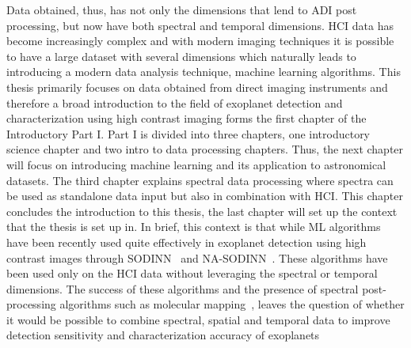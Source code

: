 Data obtained, thus, has not only the dimensions that lend to ADI post processing, but now have both spectral and temporal dimensions.
HCI data has become increasingly complex and with modern imaging techniques it is possible to have a large dataset with several dimensions which naturally
leads to introducing a modern data analysis technique, machine learning algorithms.
This thesis primarily focuses on data obtained from direct imaging instruments and therefore a broad introduction to the field of exoplanet detection and characterization using high contrast imaging forms the first chapter of the Introductory Part I.
Part I is divided into three chapters, one introductory science chapter and two intro to data processing chapters.
Thus, the next chapter will focus on introducing machine learning and its application to astronomical datasets.
The third chapter explains spectral data processing where spectra can be used as standalone data input but also in combination with HCI.
This chapter concludes the introduction to this thesis, the last chapter will set up the context that the thesis is set up in.
In brief, this context is that while ML algorithms have been recently used quite effectively in exoplanet detection using high contrast images through SODINN~\citep[][]{2018Gomez}
and NA-SODINN~\citep[][]{2023Carlito}.
These algorithms have been used only on the HCI data without leveraging the spectral or temporal dimensions. 
The success of these algorithms and the presence of spectral post-processing algorithms such as molecular mapping~\citep[][]{2018AHoeijmakersMM},
leaves the question of whether it would be possible to combine spectral, spatial and temporal data to improve detection sensitivity and characterization accuracy of exoplanets %

